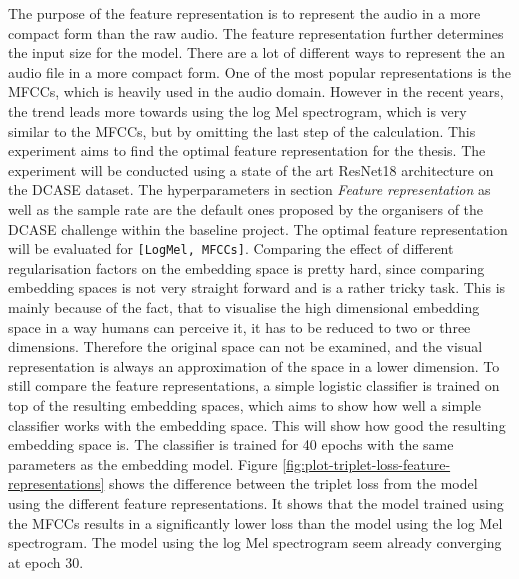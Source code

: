 \noindent
The purpose of the feature representation is to represent the audio in a more compact form than the raw audio. The feature representation further determines the input size for the model. There are a lot of different ways to represent the an audio file in a more compact form. One of the most popular representations is the MFCCs, which is heavily used in the audio domain. However in the recent years, the trend leads more towards using the log Mel spectrogram, which is very similar to the MFCCs, but by omitting the last step of the calculation. This experiment aims to find the optimal feature representation for the thesis.
\newline
\newline
The experiment will be conducted using a state of the art ResNet18 architecture on the \gls{DCASE} dataset. The hyperparameters in section \textit{Feature representation} as well as the sample rate are the default ones proposed by the organisers of the \gls{DCASE} challenge within the baseline project.
The optimal feature representation will be evaluated for \texttt{[LogMel, MFCCs]}.
\newline
\newline
Comparing the effect of different regularisation factors on the embedding space is pretty hard, since comparing embedding spaces is not very straight forward and is a rather tricky task. This is mainly because of the fact, that to visualise the high dimensional embedding space in a way humans can perceive it, it has to be reduced to two or three dimensions. Therefore the original space can not be examined, and the visual representation is always an approximation of the space in a lower dimension. To still compare the feature representations, a simple logistic classifier is trained on top of the resulting embedding spaces, which aims to show how well a simple classifier works with the embedding space. This will show how good the resulting embedding space is. The classifier is trained for 40 epochs with the same parameters as the embedding model.
\newline
\newline
Figure \ref{fig:plot-triplet-loss-feature-representations} shows the difference between the triplet loss from the model using the different feature representations. It shows that the model trained using the MFCCs results in a significantly lower loss than the model using the log Mel spectrogram. The model using the log Mel spectrogram seem already converging at epoch 30.
\newline
\newline
